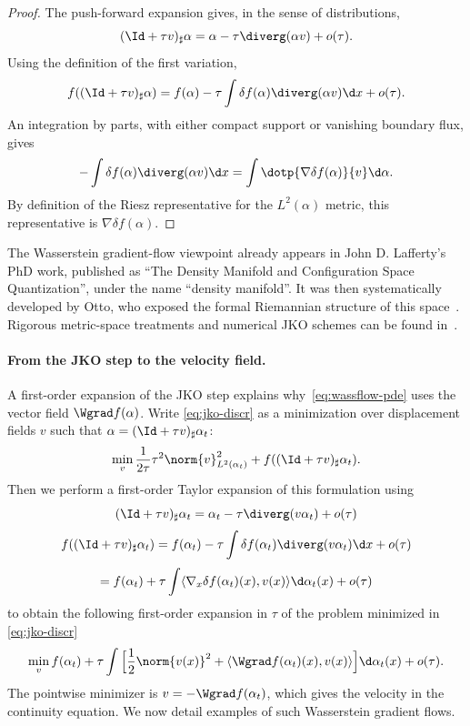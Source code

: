 \begin{proof}
	The push-forward expansion gives, in the sense of distributions,
	\[
		(\Id+\tau v)_\sharp\alpha
		=
		\alpha-\tau\diverg(\alpha v)+o(\tau).
	\]
	Using the definition of the first variation,
	\[
		f((\Id+\tau v)_\sharp\alpha)
		=
		f(\alpha)-\tau\int \delta f(\alpha)\diverg(\alpha v)\d x+o(\tau).
	\]
	An integration by parts, with either compact support or vanishing boundary flux, gives
	\[
		-\int \delta f(\alpha)\diverg(\alpha v)\d x
		=
		\int \dotp{\nabla\delta f(\alpha)}{v}\d\alpha.
	\]
	By definition of the Riesz representative for the $L^2(\alpha)$ metric, this representative is $\nabla\delta f(\alpha)$.
\end{proof}

The Wasserstein gradient-flow viewpoint already appears in John D. Lafferty's PhD work, published as ``The Density Manifold and Configuration Space Quantization'', under the name ``density manifold''. It was then systematically developed by Otto, who exposed the formal Riemannian structure of this space~\cite{otto2001geometry}. Rigorous metric-space treatments and numerical JKO schemes can be found in~\cite{ambrosio2006gradient,JDB-JKO,2015-Peyre-siims,gallouet2017jko}.

\paragraph{From the JKO step to the velocity field.}

A first-order expansion of the JKO step explains why~\eqref{eq:wassflow-pde} uses the vector field $\Wgrad f(\alpha)$. Write \eqref{eq:jko-discr} as a minimization over displacement fields $v$ such that $\alpha = (\Id + \tau v)_\sharp \alpha_t$:
	\[
		\min_{v} \frac{1}{2 \tau} \tau^2 \norm{v}_{L^2(\alpha_t)}^2 + f( (\Id + \tau v)_\sharp \alpha_t ).
	\]
Then we perform a first-order Taylor expansion of this formulation using
	\[
		 (\Id + \tau v)_\sharp \alpha_t =  \alpha_t - \tau \diverg( v \alpha_t ) + o(\tau)
	\]
	\[
		f( (\Id + \tau v)_\sharp \alpha_t ) = f(\alpha_t) - \tau \int \delta f(\alpha_t) \diverg( v \alpha_t ) \d x + o(\tau)
	\]
	\[
		 = f(\alpha_t) + \tau \int \langle \nabla_x \delta f(\alpha_t)(x), v(x) \rangle \d \alpha_t(x) + o(\tau)
	\]
to obtain the following first-order expansion in $\tau$ of the problem minimized in \eqref{eq:jko-discr}
	\[
		 \min_{v} f(\alpha_t) +  \tau \int \Big[ \frac{1}{2} \norm{v(x)}^2 + \langle \Wgrad f(\alpha_t)(x), v(x) \rangle \Big]\d \alpha_t(x) + o(\tau).
	\]
The pointwise minimizer is $v=-\Wgrad f(\alpha_t)$, which gives the velocity in the continuity equation.
We now detail examples of such Wasserstein gradient flows.

